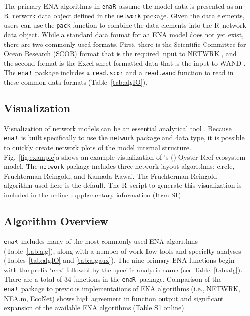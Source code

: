 \documentclass[11pt]{article}
\def\citeapos#1{\citeauthor{#1}'s (\citeyear{#1})}
\newcommand{\R}{R}
\newcommand{\enaR}{\texttt{enaR}}
\begin{document}
\begin{spacing}{2}
The primary ENA algorithms in \enaR\ assume the model data is
presented as an \R\ network data object defined in the
\texttt{network} package.  Given the data elements, users can use
the \texttt{pack} function to combine the data elements into the \R\
network data object. While a standard data format for an ENA model
does not yet exist, there are two commonly used formats.  First, there
is the Scientific Committee for Ocean Research (SCOR) format that is
the required input to NETWRK \citep{ulanowicz91}, and the second
format is the Excel sheet formatted data that is the input to WAND
\citep{allesina04_wand}.  The \enaR\ package includes a
\texttt{read.scor} and a \texttt{read.wand} function to read in these
common data formats (Table~\ref{tab:algIO}).

\subsection{Visualization}
Visualization of network models can be an essential analytical tool
\citep{moody05dynamic, lima2011visual}.  Because \enaR\ is built
specifically to use the \texttt{network} package and data type, it is possible to
quickly create network plots of the model internal structure.
Fig.~\ref{fig:example}a shows an example visualization of
\citeapos{dame81} Oyster Reef ecosystem model.  The \texttt{network}
package includes three network layout algorithms: circle,
Fruchterman-Reingold, and Kamada-Kawai.  The Fruchterman-Reingold
algorithm used here is the default.  The \R\ script to generate this
visualization is included in the online supplementary information
(Item S1).

\subsection{Algorithm Overview}
\enaR\ includes many of the most commonly used ENA algorithms
(Table~\ref{tab:alg}), along with a number of work flow tools and specialty
analyses (Tables~\ref{tab:algIO} and \ref{tab:algaux}).  The nine
primary ENA functions begin with the prefix `ena' followed by the
specific analysis name (see Table~\ref{tab:alg}).  There are a total
of 34 functions in the \enaR\ package. Comparison of the
\enaR\ package to previous implementations of ENA algorithms (i.e.,
NETWRK, NEA.m, EcoNet) shows high agreement in function output and
significant expansion of the available ENA algorithms (Table S1 online).


\end{spacing}
\end{document}
